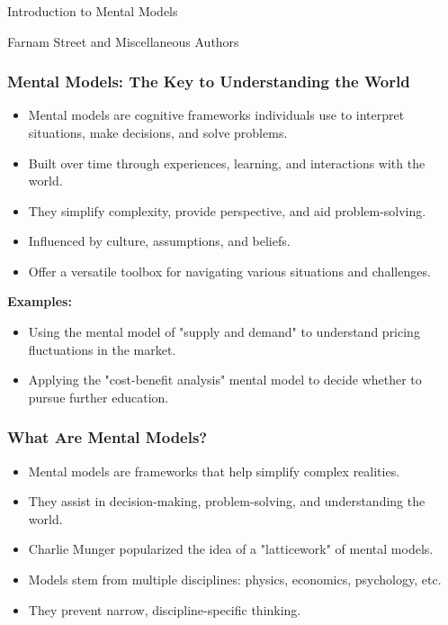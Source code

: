 \begin{frame}[fragile]\frametitle{}
\begin{center}
{\Large Introduction to Mental Models}

{\tiny Farnam Street and Miscellaneous Authors }


\end{center}
\end{frame}

\begin{frame}[fragile]\frametitle{Mental Models: The Key to Understanding the World}
\begin{itemize}
    \item Mental models are cognitive frameworks individuals use to interpret situations, make decisions, and solve problems.
    \item Built over time through experiences, learning, and interactions with the world.
    \item They simplify complexity, provide perspective, and aid problem-solving.
    \item Influenced by culture, assumptions, and beliefs.
    \item Offer a versatile toolbox for navigating various situations and challenges.
\end{itemize}
\textbf{Examples:}
\begin{itemize}
    \item Using the mental model of "supply and demand" to understand pricing fluctuations in the market.
    \item Applying the "cost-benefit analysis" mental model to decide whether to pursue further education.
\end{itemize}
\end{frame}

\begin{frame}[fragile]\frametitle{What Are Mental Models?}
    \begin{itemize}
        \item Mental models are frameworks that help simplify complex realities.
        \item They assist in decision-making, problem-solving, and understanding the world.
        \item Charlie Munger popularized the idea of a "latticework" of mental models.
        \item Models stem from multiple disciplines: physics, economics, psychology, etc.
        \item They prevent narrow, discipline-specific thinking.
    \end{itemize}
\end{frame}

